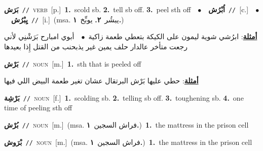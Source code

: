 \documentclass[10pt,a4paper,twoside]{article} %
\begin{document}
\begin{multicols}{2}
{\setlength\topsep{0pt}\textbf{\foreignlanguage{arabic}{بَرَش}}\ {\color{gray}\texttt{//}\color{black}}\ \textsc{verb}\ [p.]\ \textbf{1.}~scold sb.  \textbf{2.}~tell sb off.  \textbf{3.}~peel sth off\ \ $\bullet$\ \ \setlength\topsep{0pt}\textbf{\foreignlanguage{arabic}{اُبْرُش}}\ {\color{gray}\texttt{//}\color{black}}\ [c.]\ \ $\bullet$\ \ \setlength\topsep{0pt}\textbf{\foreignlanguage{arabic}{يِبْرُش}}\ {\color{gray}\texttt{//}\color{black}}\ [i.]\ \color{gray}(msa. \foreignlanguage{arabic}{يبشُر}~\foreignlanguage{arabic}{\textbf{٢.}}  \foreignlanguage{arabic}{يوبِّخ}~\foreignlanguage{arabic}{\textbf{١.}})\color{black}\  \begin{flushright}\color{gray}\foreignlanguage{arabic}{\textbf{\underline{\foreignlanguage{arabic}{أمثلة}}}: ابرُشي شوية ليمون على الكيكة بتعطي طعمة زاكية\ $\bullet$\ \  أبوي امبارح بَرَشْنِي لأني رجعت متأخر عالدار حلف يمين غير يذبحنب من القتل إِذا بعيدها}\end{flushright}\color{black}} \vspace{2mm}

{\setlength\topsep{0pt}\textbf{\foreignlanguage{arabic}{بَرْش}}\ {\color{gray}\texttt{//}\color{black}}\ \textsc{noun}\ [m.]\ \textbf{1.}~sth that is peeled off\  \begin{flushright}\color{gray}\foreignlanguage{arabic}{\textbf{\underline{\foreignlanguage{arabic}{أمثلة}}}: حطي عليها بَرْش البرتقال عشان تغير طعمة البيض اللي فيها}\end{flushright}\color{black}} \vspace{2mm}

{\setlength\topsep{0pt}\textbf{\foreignlanguage{arabic}{بَرْشِة}}\ {\color{gray}\texttt{//}\color{black}}\ \textsc{noun}\ [f.]\ \textbf{1.}~scolding sb.  \textbf{2.}~telling sb off.  \textbf{3.}~toughening sb.  \textbf{4.}~one time of peeling sth off\ } \vspace{2mm}

{\setlength\topsep{0pt}\textbf{\foreignlanguage{arabic}{بُرْش}}\ {\color{gray}\texttt{//}\color{black}}\ \textsc{noun}\ [m.]\ \color{gray}(msa. \foreignlanguage{arabic}{فراش السجين}~\foreignlanguage{arabic}{\textbf{١.}})\color{black}\ \textbf{1.}~the mattress in the prison cell\ } \vspace{2mm}

{\setlength\topsep{0pt}\textbf{\foreignlanguage{arabic}{بْرَوش}}\ {\color{gray}\texttt{//}\color{black}}\ \textsc{noun}\ [m.]\ \color{gray}(msa. \foreignlanguage{arabic}{فراش السجين}~\foreignlanguage{arabic}{\textbf{١.}})\color{black}\ \textbf{1.}~the mattress in the prison cell\ } \vspace{2mm}


\end{multicols}
\end{document}
